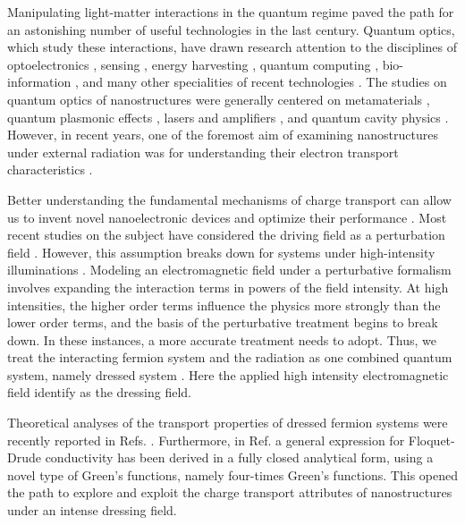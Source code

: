 
Manipulating light-matter interactions in the quantum regime paved the path for an astonishing number of useful technologies in the last century. Quantum optics, which study these interactions, have drawn research attention to the disciplines of optoelectronics \cite{liu16,wijesekara20,tao21}, sensing \cite{rodrigo2015,pirandola18,hapuarachchi2018}, energy harvesting \cite{yuan16,sun18},
quantum computing \cite{huh15,slussarenko19,andersen21}, bio-information \cite{marais18,bian20}, and many other specialities of recent technologies \cite{rivera20}.
The studies on quantum optics of nanostructures were generally centered on metamaterials \cite{shalaev07,si14}, quantum plasmonic effects \cite{hapuarachchi19,perera20}, lasers and amplifiers \cite{zhang05,chow13}, and quantum cavity physics \cite{tsang10,devi20}.
However, in recent years, one of the foremost aim of examining nanostructures under external radiation was for understanding their electron transport characteristics \cite{kitagawa11,zhou11,kibis14,pervishko15,morina15,dehghani15,dini16,wackerl20}.

Better understanding the fundamental mechanisms of charge transport can allow us to invent novel nanoelectronic devices and optimize their performance \cite{premaratne21}.
Most recent studies on the subject have considered the driving field as a perturbation field \cite{pervishko15,morina15}. However, this assumption breaks down for systems under high-intensity illuminations \cite{grifoni98,wackerl20}.
Modeling an electromagnetic field under a perturbative formalism involves expanding the interaction terms in powers of the field intensity. At high intensities, the higher order terms influence the physics more strongly than the lower order terms, and the basis of the perturbative treatment begins to break down.
In these instances, a more accurate treatment needs to adopt. Thus, we treat the interacting fermion system and the radiation as one combined quantum system, namely dressed system \cite{morina15,cohen98,scully01}. Here the applied high intensity  electromagnetic field identify as the dressing field.

Theoretical analyses of the transport properties of dressed fermion systems were recently reported in Refs. \cite{kibis14,morina15,wackerl20}.
Furthermore, in Ref. \cite{wackerl20} a general expression for Floquet-Drude conductivity has been derived in a fully closed analytical form, using a novel type of Green’s functions, namely four-times Green’s functions. This opened the path to explore and exploit the charge transport attributes of nanostructures under an intense dressing field.


